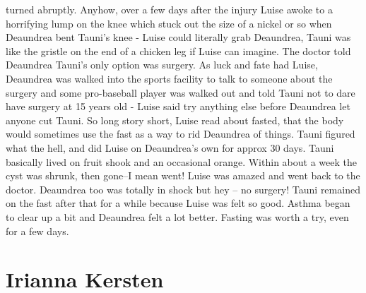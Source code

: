 \documentclass[12pt]{book}
\begin{document}
turned abruptly. Anyhow, over a few days after the injury Luise awoke to a horrifying lump on the knee which stuck out the size of a nickel or so when Deaundrea bent Tauni's knee - Luise could literally grab Deaundrea, Tauni was like the gristle on the end of a chicken leg if Luise can imagine. The doctor told Deaundrea Tauni's only option was surgery. As luck and fate had Luise, Deaundrea was walked into the sports facility to talk to someone about the surgery and some pro-baseball player was walked out and told Tauni not to dare have surgery at 15 years old - Luise said try anything else before Deaundrea let anyone cut Tauni. So long story short, Luise read about fasted, that the body would sometimes use the fast as a way to rid Deaundrea of things. Tauni figured what the hell, and did Luise on Deaundrea's own for approx 30 days. Tauni basically lived on fruit shook and an occasional orange. Within about a week the cyst was shrunk, then gone--I mean went! Luise was amazed and went back to the doctor. Deaundrea too was totally in shock but hey -- no surgery! Tauni remained on the fast after that for a while because Luise was felt so good. Asthma began to clear up a bit and Deaundrea felt a lot better. Fasting was worth a try, even for a few days.



\chapter{Irianna Kersten}
\end{document}
